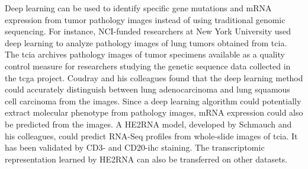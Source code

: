 \documentclass[12pt, a4paper]{article}
\begin{document}
Deep learning can be used to identify specific gene mutations and mRNA expression from tumor pathology images instead of using traditional genomic sequencing. 
For instance, NCI-funded researchers\citep{Coudray2018} at New York University used deep learning to analyze pathology images of lung tumors obtained from \acrfull{tcia}.
The \acrshort{tcia} archives pathology images of tumor specimens available as a quality control measure for researchers studying the genetic sequence data collected in the \acrshort{tcga} project.
Coudray and his colleagues found that the deep learning method could accurately distinguish between lung adenocarcinoma and lung squamous cell carcinoma from the images\citep{Coudray2018}.
Since a deep learning algorithm could potentially extract molecular phenotype from pathology images, 
mRNA expression could also be predicted from the images.
A HE2RNA model, developed by Schmauch and his colleagues\citep{Schmauch2020},  could predict RNA-Seq profiles from whole-slide images of \acrshort{tcia}. 
It has been validated by CD3- and CD20-\acrshort{ihc} staining. 
The transcriptomic representation learned by HE2RNA can also be transferred on other datasets.
\end{document}
